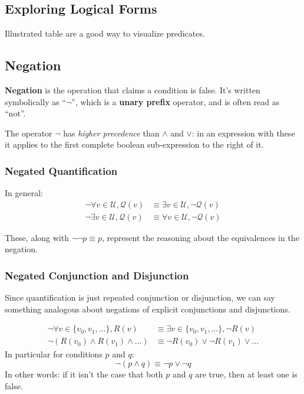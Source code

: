 \documentclass{article}
\begin{document}
\subsection{Exploring Logical Forms}
Illustrated table are a good way to visualize predicates.

\subsection{Negation}
\textbf{Negation} is the operation that claims a condition is false. It’s written symbolically as “$\neg$”, which is a \textbf{unary prefix} operator, and is often read as “not”.

The operator $\neg$ has \textit{higher precedence} than $\wedge$ and $\vee$: in an expression with these it applies to the first complete boolean sub-expression to the right of it.

\subsubsection{Negated Quantification}
In general:
\[
\begin{aligned}
\neg \forall v\in \mathcal{U}, \mathcal{Q}(v) &\equiv\exists v\in\mathcal{U},\neg \mathcal{Q}(v)\\
\neg \exists v\in \mathcal{U}, \mathcal{Q}(v) &\equiv\forall v\in\mathcal{U},\neg \mathcal{Q}(v)
\end{aligned}
\]

These, along with $\neg\neg p\equiv p$, represent the reasoning about the equivalences in the negation.

\subsubsection{Negated Conjunction and Disjunction}
Since quantification is just repeated conjunction or disjunction, we can say something analogous about negations of explicit conjunctions and disjunctions.

\[
\begin{aligned}
    \neg \forall v\in\{v_0,v_1,\dots\},R(v) &\equiv \exists v\in\{v_0,v_1,\dots\},\neg R(v)\\
    \neg (R(v_0)\wedge R(v_1)\wedge\dots) &\equiv \neg R(v_0)\vee \neg R(v_1)\vee\dots
\end{aligned}
\]
In particular for conditions $p$ and $q$:
\[
\neg (p\wedge q) \equiv \neg p\vee \neg q
\]
In other words: if it isn’t the case that both $p$ and $q$ are true, then at least one is false.
\end{document}
